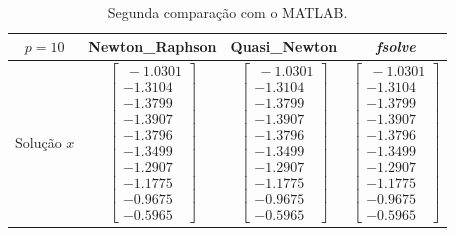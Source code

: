 \documentclass[
	12pt,				%
	oneside,			%
	a4paper,			%
	english,			%
	french,				%
	spanish,			%
	brazil				%
	]{abntex2}
\newcommand{\MATLAB}{MATLAB\textsuperscript{\textregistered}\xspace}
\begin{document}
\newpage

\begin{table}[h]
    \vspace*{0,2cm}
    \centering
    \caption{Segunda comparação com o \MATLAB.}
    \begin{tabular}{|c|c|c|c|} \hline 
    $p=10$ & Newton\_Raphson & Quasi\_Newton & \textit{fsolve} \\ \hline 
    \newline Solução $x$\newline  & \newline $\left[ \begin{array}{c}
    \ -1.0301 \\ 
    -1.3104 \\ 
    -1.3799 \\ 
    -1.3907 \\ 
    -1.3796 \\ 
    -1.3499 \\ 
    -1.2907 \\ 
    -1.1775 \\ 
    -0.9675 \\ 
    -0.5965 \end{array}
    \right]$\newline  & $\left[ \begin{array}{c}
    \ -1.0301 \\ 
    -1.3104 \\ 
    -1.3799 \\ 
    -1.3907 \\ 
    -1.3796 \\ 
    -1.3499 \\ 
    -1.2907 \\ 
    -1.1775 \\ 
    -0.9675 \\ 
    -0.5965 \end{array}
    \right]$ & $\left[ \begin{array}{c}
    \ -1.0301 \\ 
    -1.3104 \\ 
    -1.3799 \\ 
    -1.3907 \\ 
    -1.3796 \\ 
    -1.3499 \\ 
    -1.2907 \\ 
    -1.1775 \\ 
    -0.9675 \\ 
    -0.5965 \end{array}
    \right]$ \\ \hline 

\end{tabular}
\end{table}
\end{document}
